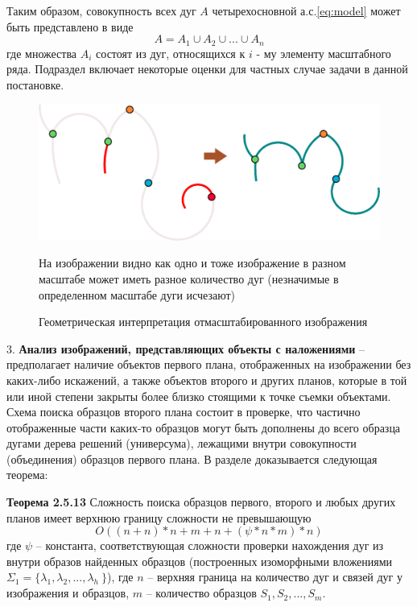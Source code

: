 Таким образом, совокупность всех дуг $A$ четырехосновной а.с.\ref{eq:model} может быть представлено в виде \begin{equation}
A = A_1 \cup A_2 \cup ... \cup A_n
\label{eq:components_set}
\end{equation}
где  множества $A_i$ состоят из дуг, относящихся к $i$ - му элементу масштабного ряда. Подраздел включает некоторые оценки для частных случае задачи в данной постановке.

\begin{figure}[h]
\centering
\includegraphics[width=0.85\linewidth,keepaspectratio]{images/scaleline}
\caption{Геометрическая интерпретация отмасштабированного изображения}
\medskip
\small
На изображении видно как одно и тоже изображение в разном масштабе может иметь разное количество дуг (незначимые в определенном масштабе дуги исчезают)
\end{figure}


3. \textbf{Анализ изображений, представляющих объекты с наложениями} -- предполагает наличие объектов первого плана, отображенных на изображении без каких-либо искажений,  а также объектов второго и других планов, которые в той или иной степени закрыты более близко стоящими к точке съемки объектами. Схема поиска образцов второго плана состоит в проверке, что частично отображенные части каких-то образцов могут быть дополнены до всего образца дугами дерева решений (универсума), лежащими внутри  совокупности (объединения) образцов первого плана. В разделе доказывается следующая теорема:

\medskip
\textbf{Теорема 2.5.13} Сложность поиска образцов первого, второго и любых других планов имеет верхнюю границу сложности не превышающую  
\begin{equation}
O((n+n)*n+m+n+(\psi*n*m)*n)
\label{overlaps:11}
\end{equation}
где  $\psi$ -- константа, соответствующая сложности проверки нахождения дуг из   внутри  образов найденных образцов (построенных изоморфными вложениями $\Sigma_1  =  \{\lambda_1, \lambda_2 ,..., \lambda_h\ \}$), где  $n$ -- верхняя граница на количество дуг и связей дуг у изображения и образцов,  $m$ -- количество образцов  $S_1, S_2, ..., S_m$.
\medskip


